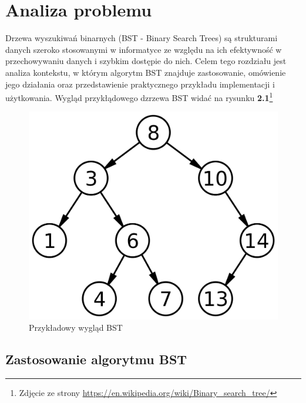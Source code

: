 
\newpage
\section{Analiza problemu}

Drzewa wyszukiwań binarnych (BST - Binary Search Trees) są strukturami danych szeroko stosowanymi w informatyce ze względu na ich efektywność w przechowywaniu danych i szybkim dostępie do nich. Celem tego rozdziału jest analiza kontekstu, w którym algorytm BST znajduje zastosowanie, omówienie jego działania oraz przedstawienie praktycznego przykładu implementacji i użytkowania. Wygląd przykłądowego dzrzewa BST widać na rysunku \textbf{2.1}\footnote{Zdjęcie ze strony  \url{https://en.wikipedia.org/wiki/Binary_search_tree/}\cite{www2}}

\begin{figure}[htb!]
	\centering
	\includegraphics[width=0.8\linewidth]{rys/bst.png}
	\caption{Przykładowy wygląd BST}
\end{figure}

\subsection{Zastosowanie algorytmu BST}

